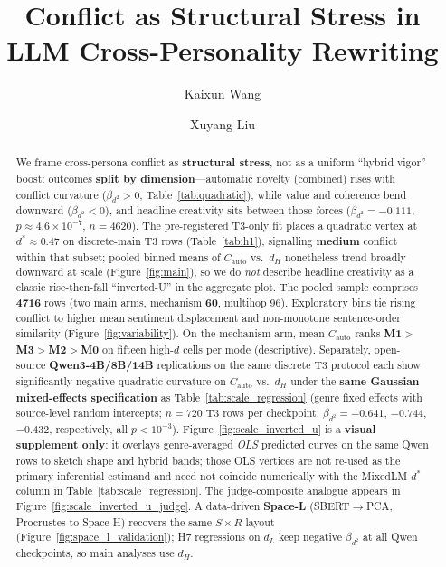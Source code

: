 \documentclass[sigconf,nonacm]{acmart}
\title[Conflict as Structural Stress in LLM Cross-Personality Rewriting]{Conflict as Structural Stress in LLM Cross-Personality Rewriting}
\author{Kaixun Wang}
\author{Xuyang Liu}
\affiliation{
  \institution{Southern University of Science and Technology}
  \city{Shenzhen}
  \country{China}
}
\begin{document}
\begin{abstract}
We frame cross-persona conflict as \textbf{structural stress}, not as a uniform ``hybrid vigor'' boost: outcomes \textbf{split by dimension}---automatic novelty (combined) rises with conflict curvature ($\beta_{d^2}{>}0$, Table~\ref{tab:quadratic}), while value and coherence bend downward ($\beta_{d^2}{<}0$), and headline creativity sits between those forces ($\beta_{d^2}{=}{-}0.111$, $p{\approx}4.6{\times}10^{-7}$, $n{=}4620$).
The pre-registered T3-only fit places a quadratic vertex at $d^\ast{\approx}0.47$ on discrete-main T3 rows (Table~\ref{tab:h1}), signalling \textbf{medium} conflict within that subset; pooled binned means of $C_{\mathrm{auto}}$ vs.\ $d_H$ nonetheless trend broadly downward at scale (Figure~\ref{fig:main}), so we do \emph{not} describe headline creativity as a classic rise-then-fall ``inverted-U'' in the aggregate plot.
The pooled sample comprises \textbf{4716} rows (two main arms, mechanism \textbf{60}, multihop 96). Exploratory bins tie rising conflict to higher mean sentiment displacement and non-monotone sentence-order similarity (Figure~\ref{fig:variability}). On the mechanism arm, mean $C_{\mathrm{auto}}$ ranks \textbf{M1}${>}$\textbf{M3}${>}$\textbf{M2}${>}$\textbf{M0} on fifteen high-$d$ cells per mode (descriptive).
Separately, open-source \textbf{Qwen3-4B/8B/14B} replications on the same discrete T3 protocol each show significantly negative quadratic curvature on $C_{\mathrm{auto}}$ vs.\ $d_H$ under the \textbf{same Gaussian mixed-effects specification} as Table~\ref{tab:scale_regression} (genre fixed effects with source-level random intercepts; $n{=}720$ T3 rows per checkpoint: $\beta_{d^2}{=}{-}0.641$, $-0.744$, $-0.432$, respectively, all $p{<}10^{-3}$).
Figure~\ref{fig:scale_inverted_u} is a \textbf{visual supplement only}: it overlays genre-averaged \emph{OLS} predicted curves on the same Qwen rows to sketch shape and hybrid bands; those OLS vertices are not re-used as the primary inferential estimand and need not coincide numerically with the MixedLM $d^\ast$ column in Table~\ref{tab:scale_regression}.
The judge-composite analogue appears in Figure~\ref{fig:scale_inverted_u_judge}.
A data-driven \textbf{Space-L} (SBERT$\to$PCA, Procrustes to Space-H) recovers the same $S{\times}R$ layout (Figure~\ref{fig:space_l_validation}); H7 regressions on $d_L$ keep negative $\beta_{d^2}$ at all Qwen checkpoints, so main analyses use $d_H$.
\end{abstract}

\end{document}
